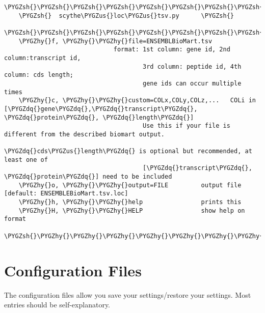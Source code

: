 \documentclass[letterpaper,10pt,english]{sphinxmanual}
\def\PYGZus{\char`\_}
\def\PYGZsh{\char`\#}
\def\PYGZhy{\char`\-}
\def\PYGZdq{\char`\"}
\begin{document}
\begin{Verbatim}[commandchars=\\\{\}]
    \PYGZsh{}\PYGZsh{}\PYGZsh{}\PYGZsh{}\PYGZsh{}\PYGZsh{}\PYGZsh{}\PYGZsh{}\PYGZsh{}\PYGZsh{}\PYGZsh{}\PYGZsh{}\PYGZsh{}\PYGZsh{}\PYGZsh{}\PYGZsh{}\PYGZsh{}\PYGZsh{}\PYGZsh{}\PYGZsh{}\PYGZsh{}\PYGZsh{}\PYGZsh{}\PYGZsh{}\PYGZsh{}\PYGZsh{}\PYGZsh{}
    \PYGZsh{}  scythe\PYGZus{}loc\PYGZus{}tsv.py      \PYGZsh{}
    \PYGZsh{}\PYGZsh{}\PYGZsh{}\PYGZsh{}\PYGZsh{}\PYGZsh{}\PYGZsh{}\PYGZsh{}\PYGZsh{}\PYGZsh{}\PYGZsh{}\PYGZsh{}\PYGZsh{}\PYGZsh{}\PYGZsh{}\PYGZsh{}\PYGZsh{}\PYGZsh{}\PYGZsh{}\PYGZsh{}\PYGZsh{}\PYGZsh{}\PYGZsh{}\PYGZsh{}\PYGZsh{}\PYGZsh{}\PYGZsh{}
    \PYGZhy{}f, \PYGZhy{}\PYGZhy{}file=ENSEMBLBioMart.tsv
                              format: 1st column: gene id, 2nd column:transcript id,
                                      3rd column: peptide id, 4th column: cds length;
                                      gene ids can occur multiple times
    \PYGZhy{}c, \PYGZhy{}\PYGZhy{}custom=COLx,COLy,COLz,...   COLi in [\PYGZdq{}gene\PYGZdq{},\PYGZdq{}transcript\PYGZdq{}, \PYGZdq{}protein\PYGZdq{}, \PYGZdq{}length\PYGZdq{}]
                                      Use this if your file is different from the described biomart output.
                                      \PYGZdq{}cds\PYGZus{}length\PYGZdq{} is optional but recommended, at least one of
                                      [\PYGZdq{}transcript\PYGZdq{}, \PYGZdq{}protein\PYGZdq{}] need to be included
    \PYGZhy{}o, \PYGZhy{}\PYGZhy{}output=FILE         output file [default: ENSEMBLEBioMart.tsv.loc]
    \PYGZhy{}h, \PYGZhy{}\PYGZhy{}help                prints this
    \PYGZhy{}H, \PYGZhy{}\PYGZhy{}HELP                show help on format
    \PYGZsh{}\PYGZhy{}\PYGZhy{}\PYGZhy{}\PYGZhy{}\PYGZhy{}\PYGZhy{}\PYGZhy{}\PYGZhy{}\PYGZhy{}\PYGZhy{}\PYGZhy{}\PYGZhy{}\PYGZhy{}\PYGZhy{}\PYGZhy{}\PYGZhy{}\PYGZhy{}\PYGZhy{}\PYGZhy{}\PYGZhy{}\PYGZhy{}\PYGZhy{}\PYGZhy{}\PYGZhy{}\PYGZhy{}\PYGZhy{}\PYGZhy{}\PYGZhy{}\PYGZhy{}\PYGZhy{}\PYGZhy{}\PYGZhy{}\PYGZhy{}\PYGZhy{}\PYGZsh{}
\end{Verbatim}


\chapter{Configuration Files}
\label{ConfigurationFiles:configuration-files}\label{ConfigurationFiles::doc}\label{ConfigurationFiles:configurationfiles}
The configuration files allow you save your settings/restore your settings.
Most entries should be self-explanatory.
\end{document}

